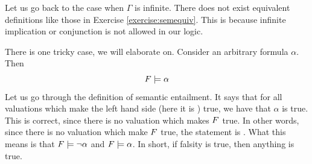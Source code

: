 Let us go back to the case when $\Gamma$ is infinite. There does not exist equivalent definitions like those in Exercise \ref{exercise:semequiv}. This is because infinite implication or conjunction is not allowed in our logic.

There is one tricky case, we will elaborate on. Consider an arbitrary formula $\alpha$. Then 
\[
F \models \alpha 
\]
Let us go through the definition of semantic entailment. It says that for all valuations which make the left hand side (here it is \false\/) true, we have that $\alpha$ is true. This is correct, since there is no valuation which makes $F$ true. In other words, since there is no valuation which make $F$ true, the statement is . What this means is that $F \models \neg \alpha$ and $F \models \alpha$. In short, if falsity is true, then anything is true.


